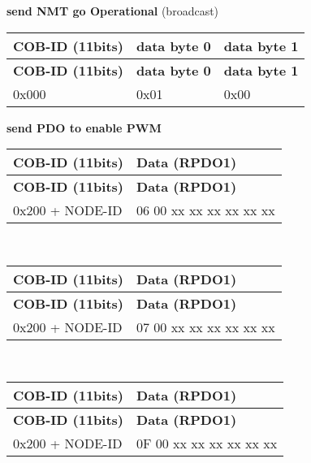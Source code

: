 \begin{DoxyEnumerate}
\item {\bfseries send N\+MT \textquotesingle{}go Operational\textquotesingle{}} (broadcast) \tabulinesep=1mm
\begin{longtabu} spread 0pt [c]{*{3}{|X[-1]}|}
\hline
\rowcolor{\tableheadbgcolor}\textbf{ C\+O\+B-\/\+ID (11bits)  }&\textbf{ data byte 0  }&\textbf{ data byte 1   }\\
\endfirsthead
\hline
\endfoot
\hline
\rowcolor{\tableheadbgcolor}\textbf{ C\+O\+B-\/\+ID (11bits)  }&\textbf{ data byte 0  }&\textbf{ data byte 1   }\\
\endhead
0x000  &0x01  &0x00   \\
\end{longtabu}



\item {\bfseries send P\+DO to enable P\+WM} ~\newline
 \tabulinesep=1mm
\begin{longtabu} spread 0pt [c]{*{2}{|X[-1]}|}
\hline
\rowcolor{\tableheadbgcolor}\textbf{ C\+O\+B-\/\+ID (11bits)  }&\textbf{ Data (R\+P\+D\+O1)   }\\
\endfirsthead
\hline
\endfoot
\hline
\rowcolor{\tableheadbgcolor}\textbf{ C\+O\+B-\/\+ID (11bits)  }&\textbf{ Data (R\+P\+D\+O1)   }\\
\endhead
0x200 + N\+O\+D\+E-\/\+ID  &06 00 xx xx xx xx xx xx   \\
\end{longtabu}
~\newline
 \tabulinesep=1mm
\begin{longtabu} spread 0pt [c]{*{2}{|X[-1]}|}
\hline
\rowcolor{\tableheadbgcolor}\textbf{ C\+O\+B-\/\+ID (11bits)  }&\textbf{ Data (R\+P\+D\+O1)   }\\
\endfirsthead
\hline
\endfoot
\hline
\rowcolor{\tableheadbgcolor}\textbf{ C\+O\+B-\/\+ID (11bits)  }&\textbf{ Data (R\+P\+D\+O1)   }\\
\endhead
0x200 + N\+O\+D\+E-\/\+ID  &07 00 xx xx xx xx xx xx   \\
\end{longtabu}
~\newline
 \tabulinesep=1mm
\begin{longtabu} spread 0pt [c]{*{2}{|X[-1]}|}
\hline
\rowcolor{\tableheadbgcolor}\textbf{ C\+O\+B-\/\+ID (11bits)  }&\textbf{ Data (R\+P\+D\+O1)   }\\
\endfirsthead
\hline
\endfoot
\hline
\rowcolor{\tableheadbgcolor}\textbf{ C\+O\+B-\/\+ID (11bits)  }&\textbf{ Data (R\+P\+D\+O1)   }\\
\endhead
0x200 + N\+O\+D\+E-\/\+ID  &0F 00 xx xx xx xx xx xx   \\
\end{longtabu}




\end{DoxyEnumerate}
